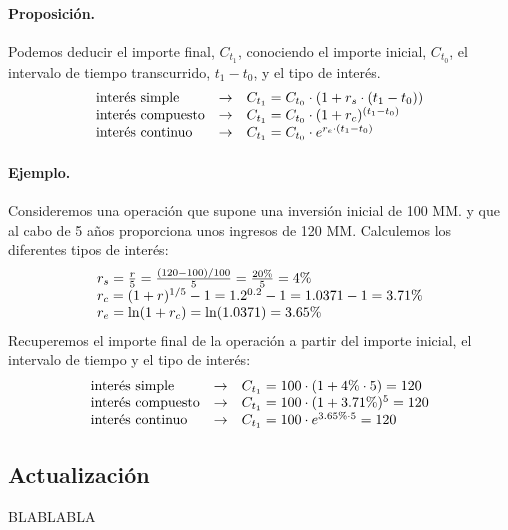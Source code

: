 \paragraph{Proposici\'on.}
Podemos deducir el importe final, $C_{t_1}$, conociendo el importe inicial, 
$C_{t_0}$, el intervalo de tiempo transcurrido, $t_1 - t_0$, y el tipo de 
inter\'es.
\begin{displaymath}
\begin{array}{lcl}
\textrm{inter\'es simple}    & \rightarrow & C_{t_1} = C_{t_0} \cdot (1+ r_s \cdot (t_1-t_0)) \cr
\textrm{inter\'es compuesto} & \rightarrow & C_{t_1} = C_{t_0} \cdot (1+ r_c)^{(t_1-t_0)}      \cr
\textrm{inter\'es continuo}  & \rightarrow & C_{t_1} = C_{t_0} \cdot e^{r_e \cdot (t_1-t_0)} 
\end{array}
\end{displaymath}

\paragraph{Ejemplo.}
Consideremos una operaci\'on que supone una inversi\'on inicial de 100 MM. y que 
al cabo de 5 a\~{n}os proporciona unos ingresos de 120 MM. 
\newline
\newline
Calculemos los diferentes tipos de inter\'es:
\begin{displaymath}
\begin{array}{l}
r_s= \frac{r}{5} = \frac{(120-100)/100}{5} = \frac{20\%}{5} = 4\% \cr
r_c= (1+r) ^ {1/5} - 1 = 1.2^{0.2} - 1 = 1.0371 - 1 = 3.71 \%       \cr
r_e= \ln(1 + r_c) = \ln(1.0371) = 3.65 \%
\end{array}
\end{displaymath}
\newline
\newline
Recuperemos el importe final de la operaci\'on a partir del importe inicial, 
el intervalo de tiempo y el tipo de inter\'es:
\begin{displaymath}
\begin{array}{lcl}
\textrm{inter\'es simple}    & \rightarrow & C_{t_1} = 100 \cdot (1 + 4\% \cdot 5) = 120 \cr
\textrm{inter\'es compuesto} & \rightarrow & C_{t_1} = 100 \cdot (1 + 3.71\%)^5 = 120 \cr
\textrm{inter\'es continuo}  & \rightarrow & C_{t_1} = 100 \cdot e^{3.65 \% \cdot 5} = 120
\end{array}
\end{displaymath}

\subsection{Actualizaci\'on}
BLABLABLA
